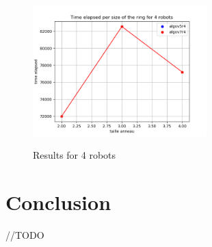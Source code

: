 \documentclass{article}
\begin{document}
\begin{figure}[!ht]
    \centering
    \includegraphics[width=0.6\textwidth]{../data/data-phiUltimate24/compar_phiUltimate24_4.png}\label{phiUltr4}
    \caption{Results for 4 robots}
\end{figure}

\FloatBarrier

\section{Conclusion}
//TODO

\newpage
\printbibliography %
\end{document}
